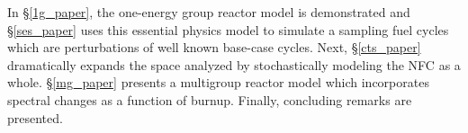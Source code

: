 In \S \ref{1g_paper}, the one-energy group reactor model is demonstrated and \S \ref{ses_paper}
uses this essential physics model to simulate a sampling fuel cycles which are perturbations of 
well known base-case cycles.  Next, \S \ref{cts_paper} dramatically
expands the space analyzed by stochastically 
modeling the NFC as a whole. \S \ref{mg_paper} presents a multigroup reactor
model which incorporates spectral changes as a function of burnup.  Finally, concluding remarks
are presented.

